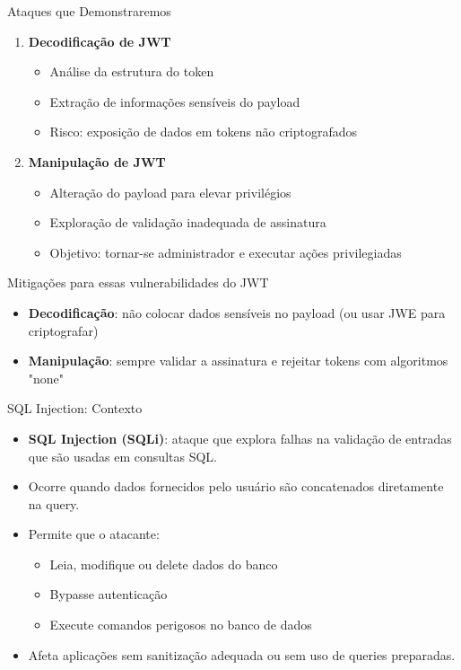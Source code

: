 \documentclass[aspectratio=169]{beamer}
\begin{document}
\begin{frame}{Ataques que Demonstraremos}
    \begin{enumerate}
        \item \textbf{Decodificação de JWT}
        \begin{itemize}
            \item Análise da estrutura do token
            \item Extração de informações sensíveis do payload
            \item Risco: exposição de dados em tokens não criptografados
        \end{itemize}
        \item \textbf{Manipulação de JWT}
        \begin{itemize}
            \item Alteração do payload para elevar privilégios
            \item Exploração de validação inadequada de assinatura
            \item Objetivo: tornar-se administrador e executar ações privilegiadas
        \end{itemize}
    \end{enumerate}
\end{frame}

\begin{frame}{Mitigações para essas vulnerabilidades do JWT}
    \begin{itemize}
        \item \textbf{Decodificação}: não colocar dados sensíveis no payload (ou usar JWE para criptografar)
        \item \textbf{Manipulação}: sempre validar a assinatura e rejeitar tokens com algoritmos "none"

    \end{itemize}
\end{frame}


\begin{frame}{SQL Injection: Contexto}
    \begin{itemize}
        \item \textbf{SQL Injection (SQLi)}: ataque que explora falhas na validação de entradas que são usadas em consultas SQL.
        \item Ocorre quando dados fornecidos pelo usuário são concatenados diretamente na query.
        \item Permite que o atacante:
        \begin{itemize}
            \item Leia, modifique ou delete dados do banco
            \item Bypasse autenticação
            \item Execute comandos perigosos no banco de dados
        \end{itemize}
        \item Afeta aplicações sem sanitização adequada ou sem uso de queries preparadas.
    \end{itemize}
\end{frame}
\end{document}
